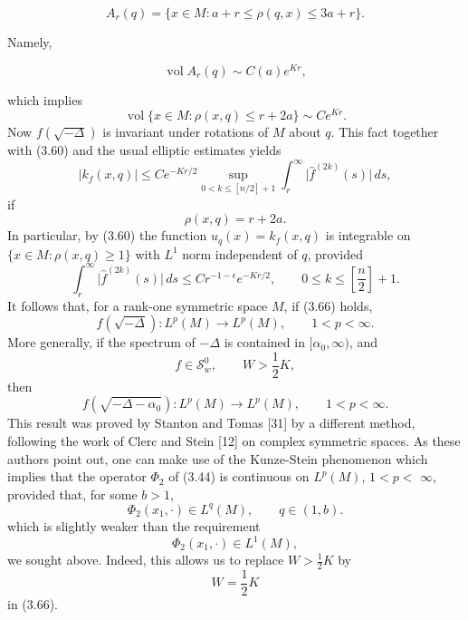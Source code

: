 \begin{equation}\tag{3.59}
A_r(q) = \{x\in M: a+r\le \rho(q,x)\le 3a+r\}.
\end{equation}

Namely,

\begin{equation}\tag{3.60}
\operatorname{vol} A_r(q) \sim C(a)e^{Kr},
\end{equation}

which implies
\begin{equation}\tag{3.61}
\operatorname{vol}\{x \in M : \rho(x,q) \leq r + 2a\} \sim Ce^{Kr}.
\end{equation}
Now $f(\sqrt{-\Delta})$ is invariant under rotations of $M$ about $q$. This fact together with (3.60) and the usual elliptic estimates yields
\begin{equation}\tag{3.62}
\lvert k_f(x,q)\rvert \leq Ce^{-Kr/2} \sup_{0<k\leq [n/2] + 1}
\int_r^\infty \lvert \hat{f}^{(2k)}(s)\rvert\, ds,
\end{equation}
if
\begin{equation}\tag{3.63}
\rho(x,q)=r+2a.
\end{equation}
In particular, by (3.60) the function $u_q(x)=k_f(x,q)$ is integrable on $\{x \in M :
\rho(x,q)\geq 1\}$ with $L^1$ norm independent of $q$, provided
\begin{equation}\tag{3.64}
\int_r^\infty \lvert \hat{f}^{(2k)}(s)\rvert\, ds \leq Cr^{-1-\epsilon}e^{-Kr/2},\qquad
0\leq k\leq \left[\frac{n}{2}\right]+1.
\end{equation}
It follows that, for a rank-one symmetric space $M$, if (3.66) holds,
\begin{equation}\tag{3.65}
f(\sqrt{-\Delta}) : L^p(M)\to L^p(M),\qquad 1<p<\infty.
\end{equation}
More generally, if the spectrum of $-\Delta$ is contained in $[\alpha_0,\infty)$, and
\begin{equation}\tag{3.66}
f\in \mathcal{S}_w^0,\qquad W>\frac{1}{2}K,
\end{equation}
then
\begin{equation}\tag{3.67}
f\!\left(\sqrt{-\Delta-\alpha_0}\right): L^p(M)\to L^p(M),\qquad 1<p<\infty.
\end{equation}
This result was proved by Stanton and Tomas [31] by a different method, following the work of Clerc and Stein [12] on complex symmetric spaces. As these authors point out, one can make use of the Kunze-Stein phenomenon which implies that the operator $\Phi_2$ of (3.44) is continuous on $L^p(M)$, $1<p<$
$\infty$, provided that, for some $b>1$,
\begin{equation}\tag{3.68}
\Phi_2(x_1,\cdot)\in L^q(M),\qquad q\in(1,b).
\end{equation}
which is slightly weaker than the requirement
\begin{equation}\tag{3.69}
\Phi_2(x_1,\cdot)\in L^1(M),
\end{equation}
we sought above. Indeed, this allows us to replace $W>\frac{1}{2}K$ by
\begin{equation}\tag{3.70}
W=\frac{1}{2}K
\end{equation}
in (3.66).
